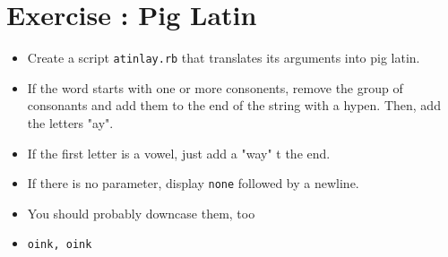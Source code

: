 \documentclass{42-en}
\begin{document}



\chapter{Exercise \exercicenumber: Pig Latin}

\exnumber{\exercicenumber}

\makeheaderfiles

\begin{itemize}

\item Create a script \texttt{atinlay.rb} that translates its arguments into pig latin.
\item If the word starts with one or more consonents, remove the group of consonants and add them to the end of the string with a hypen. Then, add the letters "ay". 
\item If the first letter is a vowel, just add a "way" t the end. 
\item If there is no parameter, display \texttt{none} followed by a newline.
\item You should probably downcase them, too
\item \texttt{oink, oink}


\end{itemize}

\end{document}
